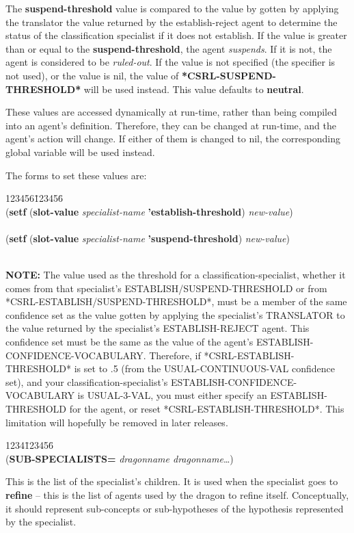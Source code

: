 The {\bf suspend-threshold} value is compared to the value by gotten
by applying the translator the value returned by the establish-reject
agent to determine the status of the classification specialist if it
does not establish. If the value is greater than or equal to the {\bf
suspend-threshold}, the agent {\it suspends}. If it is not, the agent
is considered to be {\it ruled-out}. If the value is not specified
(the specifier is not used), or the value is nil, the value of {\bf
*CSRL-SUSPEND-THRESHOLD*} will be used instead. This value defaults to
{\bf neutral}.

These values are accessed dynamically at run-time, rather than being
compiled into an agent's definition. Therefore, they can be changed at
run-time, and the agent's action will change. If either of them is
changed to nil, the corresponding global variable will be used
instead.

The forms to set these values are:

\begin{tabbing}
123456\=123456\= \kill
\\
\>({\bf setf} ({\bf slot-value} {\it specialist-name\/} {\bf
'establish-threshold}) {\it new-value\/}) \\
\\
\>({\bf setf} ({\bf slot-value} {\it specialist-name\/} {\bf
'suspend-threshold}) {\it new-value\/}) \\
\\
\end{tabbing}

{\bf NOTE:} The value used as the threshold for a
classification-specialist, whether it comes from that specialist's
ESTABLISH/SUSPEND-THRESHOLD or from
*CSRL-ESTABLISH/SUSPEND-THRESHOLD*, must be a member of the same
confidence set as the value gotten by applying the specialist's
TRANSLATOR to the value returned by the specialist's ESTABLISH-REJECT
agent. This confidence set must be the same as the value of the
agent's
ESTABLISH-CONFIDENCE-VOCABULARY.
Therefore, if *CSRL-ESTABLISH-THRESHOLD* is set to .5 (from the
USUAL-CONTINUOUS-VAL confidence set), and your
classification-specialist's ESTABLISH-CONFIDENCE-VOCABULARY is
USUAL-3-VAL, you must either specify an ESTABLISH-THRESHOLD for the
agent, or reset *CSRL-ESTABLISH-THRESHOLD*.  This limitation will
hopefully be removed in later releases.


\begin{tabbing}
1234\=123456\= \kill
\\
({\bf SUB-SPECIALISTS=} {\it dragonname dragonname\/}\ldots) \\
\end{tabbing}
This is the list of the specialist's children. It is used when the
specialist goes to {\bf refine}  -- this is the list of agents used by the
dragon to refine itself. Conceptually, it should represent
sub-concepts or sub-hypotheses of the hypothesis represented by the
specialist.


